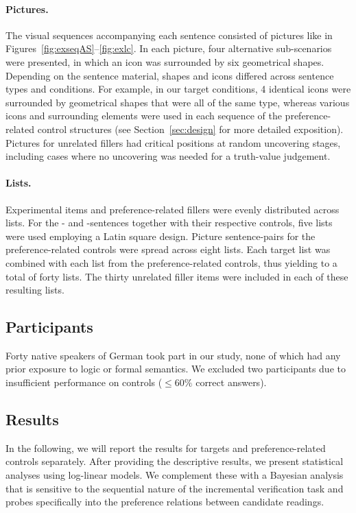 \documentclass[fleqn,reqno,10pt,draft]{article}
\newcommand{\as}{\acro{as}}
\renewcommand{\es}{\acro{es}}
\begin{document}
\paragraph{Pictures.}
The visual sequences accompanying each sentence consisted of pictures
like in Figures~\ref{fig:exseqAS}--\ref{fig:exlc}. In each picture,
four alternative sub-scenarios were presented, in which an icon was
surrounded by six geometrical shapes. Depending on the sentence
material, shapes and icons differed across sentence types and
conditions. For example, in our target conditions, 4 identical icons
were surrounded by geometrical shapes that were all of the same type,
whereas various icons and surrounding elements were used in each
sequence of the preference-related control structures (see
Section~\ref{sec:design} for more detailed exposition). Pictures for
unrelated fillers had critical positions at random uncovering stages,
including cases where no uncovering was needed for a truth-value
judgement.

\paragraph{Lists.}
Experimental items and preference-related fillers were evenly
distributed across lists. For the \as- and \es-sentences together with
their respective controls, five lists were used employing a Latin
square design. Picture sentence-pairs for the preference-related
controls were spread across eight lists. Each target list was combined
with each list from the preference-related controls, thus yielding to
a total of forty lists. The thirty unrelated filler items were
included in each of these resulting lists.


\subsection{Participants}
\label{sec:participants} 

Forty native speakers of German took part in our study, none of which
had any prior exposure to logic or formal semantics. We excluded two
participants due to insufficient performance on controls ($\le 60\%$
correct answers).


\subsection{Results}
\label{sec:results}

In the following, we will report the results for targets and
preference-related controls separately. After providing the
descriptive results, we present statistical analyses using log-linear
models. We complement these with a Bayesian analysis that is sensitive
to the sequential nature of the incremental verification task and
probes specifically into the preference relations between candidate
readings.
\end{document}
